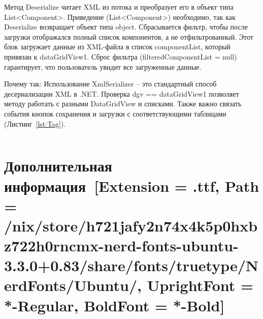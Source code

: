 \documentclass[12pt]{article}
\newcommand{\icon}[1]{\fontspec{UbuntuNerdFont}[Extension = .ttf,
  Path = /nix/store/h721jafy2n74x4k5p0hxbz722h0rncmx-nerd-fonts-ubuntu-3.3.0+0.83/share/fonts/truetype/NerdFonts/Ubuntu/,
  UprightFont = *-Regular,
BoldFont = *-Bold] #1}
\newcommand{\iicon}[1]{{\icon{#1}}}
\newcommand{\colorGIT}[1]{\textcolor{CtpLavender}{#1}}
\renewcommand{\texttt}[1]{{\small\ttfamily #1}}
\newenvironment{code}{\captionsetup{type=listing}}{}
\numberwithin{listing}{section}
\numberwithin{figure}{section}
\begin{document}
Метод \texttt{Deserialize} читает \texttt{XML} из потока и преобразует его в объект типа \texttt{List<Component>}.
Приведение \texttt{(List<Component>)} необходимо, так как \texttt{Deserialize} возвращает объект типа \texttt{object}. Сбрасывается фильтр, чтобы после загрузки отображался полный список компонентов, а не отфильтрованный. Этот блок загружает данные из \texttt{XML}-файла в список \texttt{componentList}, который привязан к \texttt{dataGridView1}. Сброс фильтра (\texttt{filteredComponentList = null}) гарантирует, что пользователь увидит все загруженные данные.

Почему так: Использование \texttt{XmlSerializer} -- это стандартный способ десериализации \texttt{XML} в \texttt{.NET}. Проверка \texttt{dgv == dataGridView1} позволяет методу работать с разными \texttt{DataGridView} и списками.
Также важно связать события кнопок сохранения и загрузки с соответствующими таблицами (Листинг~\ref{lst:Tag}).

\begin{code}
	\inputminted[firstline = 146, lastline = 163]{csharp}{../../2lab/WinFormsApp1example_/Form1.cs}
	\caption{Связь событий и кнопок с помощью \colorGIT{\href{https://github.com/WebMasterIT/Csharp_Labs/blob/c79e983c4cab3c416e44b6d5f9854b292fdeae26/2lab/WinFormsApp1example_/Form1.cs\#L146-L163}{\texttt{Tag}}}}
	\label{lst:Tag}
\end{code}

\newpage

\section{Дополнительная информация~\texorpdfstring{\iicon{}}{}}
\end{document}
